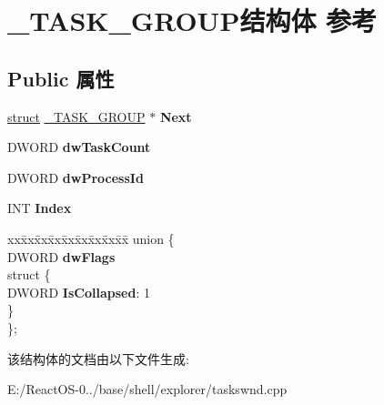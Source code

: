 \hypertarget{struct___t_a_s_k___g_r_o_u_p}{}\section{\+\_\+\+T\+A\+S\+K\+\_\+\+G\+R\+O\+U\+P结构体 参考}
\label{struct___t_a_s_k___g_r_o_u_p}
\subsection*{Public 属性}
\begin{DoxyCompactItemize}
\item 
\mbox{\label{struct___t_a_s_k___g_r_o_u_p_a17a3cc5191816614720ed5becef9f6a5}} 
\hyperlink{interfacestruct}{struct} \hyperlink{struct___t_a_s_k___g_r_o_u_p}{\+\_\+\+T\+A\+S\+K\+\_\+\+G\+R\+O\+UP} $\ast$ {\bfseries Next}
\item 
\mbox{\label{struct___t_a_s_k___g_r_o_u_p_a3ad21d7cfcb4a358751db33212f698dc}} 
D\+W\+O\+RD {\bfseries dw\+Task\+Count}
\item 
\mbox{\label{struct___t_a_s_k___g_r_o_u_p_ae4852c2ddc3c4aebe71900e9d6a45afd}} 
D\+W\+O\+RD {\bfseries dw\+Process\+Id}
\item 
\mbox{\label{struct___t_a_s_k___g_r_o_u_p_af6fbd94a376919b3d0a1a092ab448e96}} 
I\+NT {\bfseries Index}
\item 
\mbox{\label{struct___t_a_s_k___g_r_o_u_p_a8ce9d9c1242305488c64f6d90d9ebc20}} 
\begin{tabbing}
xx\=xx\=xx\=xx\=xx\=xx\=xx\=xx\=xx\=\kill
union \{\\
\>DWORD {\bfseries dwFlags}\\
\mbox{\label{union___t_a_s_k___g_r_o_u_p_1_1_0D67_a85c9e80bb033e75525a841a86c7335c1}} 
\>struct \{\\
\>\>DWORD {\bfseries IsCollapsed}: 1\\
\>\} \\
\}; \\

\end{tabbing}\end{DoxyCompactItemize}


该结构体的文档由以下文件生成\+:\begin{DoxyCompactItemize}
\item 
E\+:/\+React\+O\+S-\/0../base/shell/explorer/taskswnd.\+cpp\end{DoxyCompactItemize}
